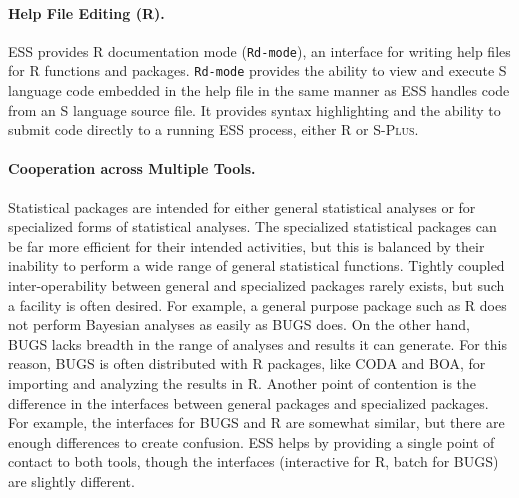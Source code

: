 \documentclass{article}
\newcommand*{\Splus}{\textsc{S-Plus}}
\newcommand{\stexttt}[1]{{\small\texttt{#1}}}
\newenvironment{Comment}{\begin{quote}\small\itshape }{\end{quote}}
\begin{document}
\paragraph{Help File Editing (R).}
ESS provides R documentation mode (\stexttt{Rd-mode}), an interface
for writing help files for R functions and packages.
\stexttt{Rd-mode} provides the ability to view and execute S language
code embedded in the help file in the same manner as ESS handles code
from an S language source file.  It provides syntax highlighting and
the ability to submit code directly to a running ESS process, either R
or \Splus.



\paragraph{Cooperation across Multiple Tools.}
\label{sec:multiple-tools}

Statistical packages are intended for either general statistical
analyses or for specialized forms of statistical analyses.  The
specialized statistical packages can be far more efficient for their
intended activities, but this is balanced by their inability to
perform a wide range of general statistical functions.  Tightly
coupled inter-operability between general and specialized packages
rarely exists, but such a facility is often desired.  For example, a
general purpose package such as R does not perform Bayesian analyses
as easily as BUGS does.  On the other hand, BUGS lacks breadth in the
range of analyses and results it can generate.  For this reason, BUGS
is often distributed with R packages, like CODA and BOA, for importing
and analyzing the results in R.  Another point of contention is the
difference in the interfaces between general packages and specialized
packages.  For example, the interfaces for BUGS and R are somewhat
similar, but there are enough differences to create confusion.  ESS
helps by providing a single point of contact to both tools, though the
interfaces (interactive for R, batch for BUGS) are slightly different.

\end{document}
